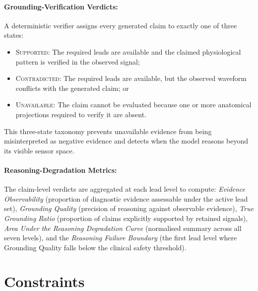 \documentclass{ssnreview}
\begin{document}
\paragraph{Grounding-Verification Verdicts:} A deterministic verifier assigns every generated
claim to exactly one of three states:
\begin{itemize}
  \item \textsc{Supported}: The required leads are available and the claimed physiological
  pattern is verified in the observed signal;
  \item \textsc{Contradicted}: The required leads are available, but the observed waveform
  conflicts with the generated claim; or
  \item \textsc{Unavailable}: The claim cannot be evaluated because one or more anatomical
  projections required to verify it are absent.
\end{itemize}
This three-state taxonomy prevents unavailable evidence from being misinterpreted as
negative evidence and detects when the model reasons beyond its visible sensor space.

\paragraph{Reasoning-Degradation Metrics:} The claim-level verdicts are aggregated at each lead
level to compute: \emph{Evidence Observability} (proportion of diagnostic evidence assessable
under the active lead set), \emph{Grounding Quality} (precision of reasoning against
observable evidence), \emph{True Grounding Ratio} (proportion of claims explicitly supported
by retained signals), \emph{Area Under the Reasoning Degradation Curve} (normalised summary
across all seven levels), and the \emph{Reasoning Failure Boundary} (the first lead level where
Grounding Quality falls below the clinical safety threshold).

\section{Constraints}
\end{document}

